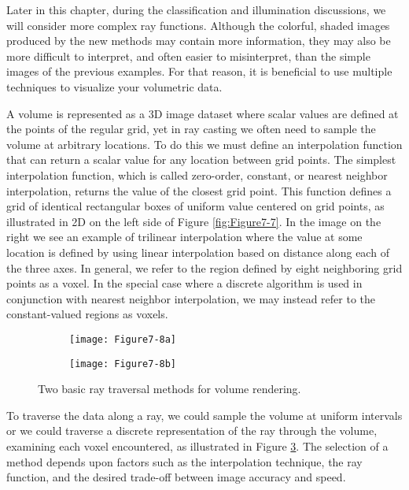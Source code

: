 Later in this chapter, during the classification and illumination discussions, we will consider more complex ray functions. Although the colorful, shaded images produced by the new methods may contain more information, they may also be more difficult to interpret, and often easier to misinterpret, than the simple images of the previous examples. For that reason, it is beneficial to use multiple techniques to visualize your volumetric data.

A volume is represented as a 3D image dataset where scalar values are defined at the points of the regular grid, yet in ray casting we often need to sample the volume at arbitrary locations. To do this we must define an interpolation function that can return a scalar value for any location between grid points. The simplest interpolation function, which is called zero-order, constant, or nearest neighbor interpolation, returns the value of the closest grid point. This function defines a grid of identical rectangular boxes of uniform value centered on grid points, as illustrated in 2D on the left side of Figure \ref{fig:Figure7-7}. In the image on the right we see an example of trilinear interpolation where the value at some location is defined by using linear interpolation based on distance along each of the three axes. In general, we refer to the region defined by eight neighboring grid points as a voxel. In the special case where a discrete algorithm is used in conjunction with nearest neighbor interpolation, we may instead refer to the constant-valued regions as voxels.

\begin{figure}[!htb]
	\begin{subfigure}[h]{0.48\linewidth}
		\texttt{[image: Figure7-8a]}
		\caption*{}\label{fig:Figure7-8a}
	\end{subfigure}
	\hfill
	\begin{subfigure}[h]{0.48\linewidth}
		\texttt{[image: Figure7-8b]}
		\caption*{}\label{fig:Figure7-8b}
	\end{subfigure}%
	\caption{Two basic ray traversal methods for volume rendering.}\label{fig:Figure7-8}
\end{figure}

To traverse the data along a ray, we could sample the volume at uniform intervals or we could traverse a discrete representation of the ray through the volume, examining each voxel encountered, as illustrated in Figure \ref{fig:Figure7-8}. The selection of a method depends upon factors such as the interpolation technique, the ray function, and the desired trade-off between image accuracy and speed.

